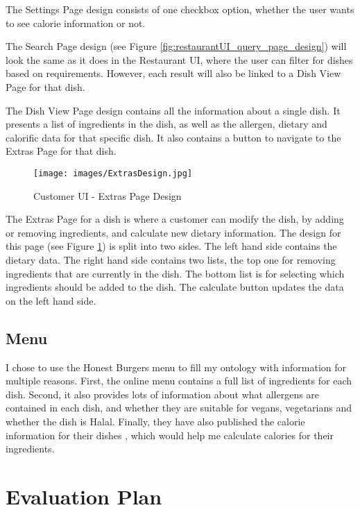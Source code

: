 The Settings Page design consists of one checkbox option, whether the user wants to see calorie information or not.

The Search Page design (see Figure \ref{fig:restaurantUI_query_page_design}) will look the same as it does in the Restaurant UI, where the user can filter for dishes based on requirements. However, each result will also be linked to a Dish View Page for that dish.

The Dish View Page design contains all the information about a single dish. It presents a list of ingredients in the dish, as well as the allergen, dietary and calorific data for that specific dish. It also contains a button to navigate to the Extras Page for that dish.

\begin{figure}[h]
    \centering
    \captionsetup{justification=centering}
    \texttt{[image: images/ExtrasDesign.jpg]}
    \caption{Customer UI - Extras Page Design}
    \label{fig:customerUI_extras_design}
\end{figure}

The Extras Page for a dish is where a customer can modify the dish, by adding or removing ingredients, and calculate new dietary information. The design for this page (see Figure \ref{fig:customerUI_extras_design}) is split into two sides. The left hand side contains the dietary data. The right hand side contains two lists, the top one for removing ingredients that are currently in the dish. The bottom list is for selecting which ingredients should be added to the dish. The calculate button updates the data on the left hand side.

\subsection{Menu}

I chose to use the Honest Burgers \cite{honest_burgers_2023} menu to fill my ontology with information for multiple reasons. First, the online menu contains a full list of ingredients for each dish. Second, it also provides lots of information about what allergens are contained in each dish, and whether they are suitable for vegans, vegetarians and whether the dish is Halal. Finally, they have also published the calorie information for their dishes \cite{honest_burgers_nutritional_2022}, which would help me calculate calories for their ingredients.

\section{Evaluation Plan}

